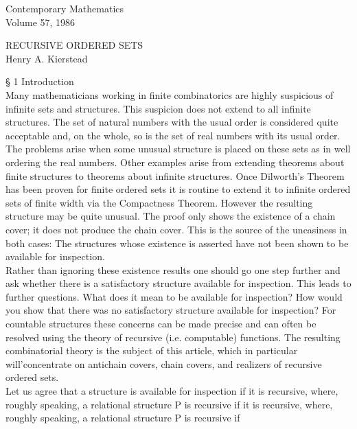 \documentclass[twoside]{article}
\begin{document}
\thispagestyle{plain}
\addtolength{\voffset}{-1.5cm}
\begin{flushleft}
Contemporary Mathematics\\
Volume 57, 1986
\end{flushleft}
\onehalfspacing
\begin{center}
RECURSIVE ORDERED SETS\\
\vspace{1mm}
Henry A. Kierstead\\
\end{center}
\vspace{2mm}
\onehalfspacing
\noindent \S \hspace{1pt} 1 Introduction\\

Many mathematicians working in finite combinatorics are highly suspicious of infinite sets and structures.   This suspicion does not extend to all infinite structures.   
The set of natural numbers with the usual order is considered quite acceptable and, on the whole, so is the set of real numbers with its usual order.   
The problems arise when some unusual structure is placed on these sets as in well ordering the real numbers.   
Other examples arise from extending theorems about finite structures to theorems about infinite   structures.    
Once Dilworth's Theorem has been proven for finite ordered sets it is routine to extend it to infinite ordered sets of finite width via the Compactness Theorem.   
However the resulting structure may be quite unusual.   
The proof only shows the existence of a chain cover; it does not produce the chain cover.   
This is the source of the uneasiness in both cases:    The structures whose existence is asserted have not been shown to be available for inspection.\\
\indent
Rather than ignoring these existence results one should go one step further and ask whether there is a satisfactory structure available for inspection. 
This leads to further questions. What does it mean to be available for inspection? 
How would you show that there was no satisfactory structure available for inspection? 
For countable structures these concerns can be made precise and can often be resolved using the theory of recursive (i.e. computable) functions.   
The resulting combinatorial theory is the subject of this article, which in particular will'concentrate on antichain covers, chain covers, and realizers of recursive ordered sets.\\
\indent
Let us agree that a structure is available for inspection if it is recursive, where, roughly speaking, a relational structure   P   is recursive if it is recursive, where, roughly speaking, a relational structure P is recursive if\\
\end{document}
